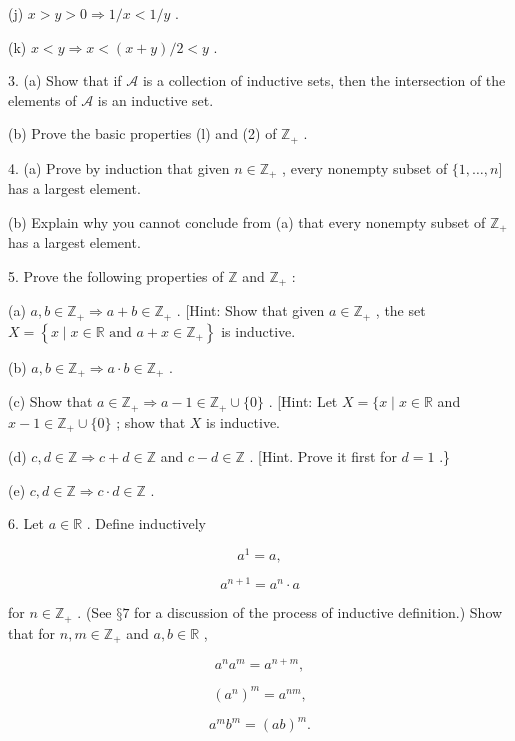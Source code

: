 (j) \(x > y > 0 \Rightarrow  1/x < 1/y\) .

(k) \(x < y \Rightarrow  x < \left( {x + y}\right) /2 < y\) .

3. (a) Show that if \(\mathcal{A}\) is a collection of inductive sets, then the intersection of the elements of \(\mathcal{A}\) is an inductive set.

(b) Prove the basic properties (l) and (2) of \({\mathbb{Z}}_{ + }\) .

4. (a) Prove by induction that given \(n \in  {\mathbb{Z}}_{ + }\) , every nonempty subset of \(\{ 1,\ldots ,n\rbrack\) has a largest element.

(b) Explain why you cannot conclude from (a) that every nonempty subset of \({\mathbb{Z}}_{ + }\) has a largest element.

5. Prove the following properties of \(\mathbb{Z}\) and \({\mathbb{Z}}_{ + }\) :

(a) \(a,b \in  {\mathbb{Z}}_{ + } \Rightarrow  a + b \in  {\mathbb{Z}}_{ + }\) . [Hint: Show that given \(a \in  {\mathbb{Z}}_{ + }\) , the set \(X = \left\{  {x \mid  x \in  \mathbb{R}\text{ and }a + x \in  {\mathbb{Z}}_{ + }}\right\}\) is inductive.

(b) \(a,b \in  {\mathbb{Z}}_{ + } \Rightarrow  a \cdot  b \in  {\mathbb{Z}}_{ + }\) .

(c) Show that \(a \in  {\mathbb{Z}}_{ + } \Rightarrow  a - 1 \in  {\mathbb{Z}}_{ + } \cup  \{ 0\}\) . [Hint: Let \(X = \{ x \mid  x \in  \mathbb{R}\) and \(x - 1 \in  {\mathbb{Z}}_{ + } \cup  \{ 0\}\) ; show that \(X\) is inductive.

(d) \(c,d \in  \mathbb{Z} \Rightarrow  c + d \in  \mathbb{Z}\) and \(c - d \in  \mathbb{Z}\) . [Hint. Prove it first for \(d = 1\) .\}

(e) \(c,d \in  \mathbb{Z} \Rightarrow  c \cdot  d \in  \mathbb{Z}\) .

6. Let \(a \in  \mathbb{R}\) . Define inductively

\[
{a}^{1} = a,
\]

\[
{a}^{n + 1} = {a}^{n} \cdot  a
\]

for \(n \in  {\mathbb{Z}}_{ + }\) . (See \(§7\) for a discussion of the process of inductive definition.) Show that for \(n,m \in  {\mathbb{Z}}_{ + }\) and \(a,b \in  \mathbb{R}\) ,

\[
{a}^{n}{a}^{m} = {a}^{n + m},
\]

\[
{\left( {a}^{n}\right) }^{m} = {a}^{nm},
\]

\[
{a}^{m}{b}^{m} = {\left( ab\right) }^{m}.
\]


